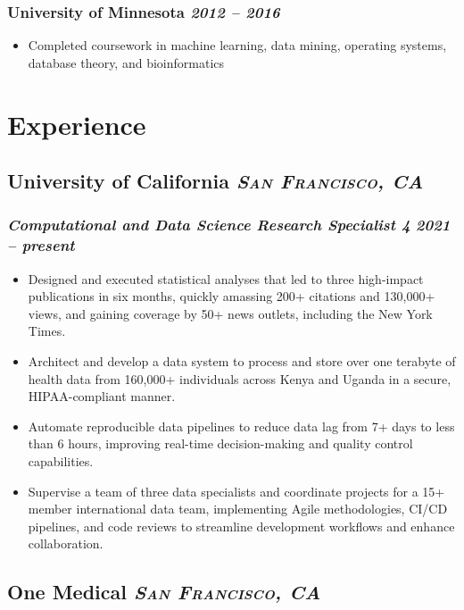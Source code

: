 \documentclass[11pt]{article}
\newcommand{\rside}[1]{
  \hfill {\itshape #1}%
}
\begin{document}
\subsubsection{University of Minnesota \rside{2012 -- 2016}}
\begin{itemize}[label=-]
    \item Completed coursework in machine learning, data mining, operating systems, database theory, and bioinformatics
\end{itemize}

\section{Experience}
\subsection{University of California \rside{\normalfont\large\bfseries\scshape{San Francisco, CA}}}
\subsubsection{\textit{Computational and Data Science Research Specialist 4} \rside{2021 -- present}}
\begin{itemize}[label=-]
  \item Designed and executed statistical analyses that led to three high-impact publications in six months, quickly amassing 200+ citations and 130,000+ views, and gaining coverage by 50+ news outlets, including the New York Times.
  \item Architect and develop a data system to process and store over one terabyte of health data from 160,000+ individuals across Kenya and Uganda in a secure, HIPAA-compliant manner.
  \item Automate reproducible data pipelines to reduce data lag from 7+ days to less than 6 hours, improving real-time decision-making and quality control capabilities.
  \item Supervise a team of three data specialists and coordinate projects for a 15+ member international data team, implementing Agile methodologies, CI/CD pipelines, and code reviews to streamline development workflows and enhance collaboration.
\end{itemize}

\subsection{One Medical \rside{\normalfont\large\bfseries\scshape{San Francisco, CA}}}
\end{document}
